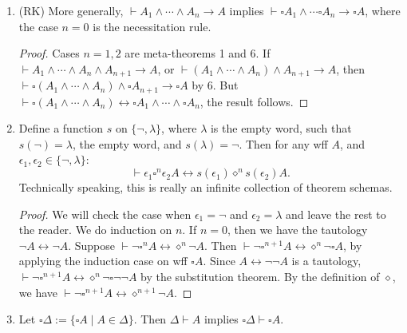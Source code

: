 \documentclass[12pt]{article}
\begin{document}
\begin{enumerate}
\begin{proof}
By assumption and 1, $\vdash \square (A\land B) \to \square C$.  Since $\square A \land \square B \to \square (A\land B)$ is a theorem (see ), we get $\vdash \square A \land \square B \to \square C$ by the law of syllogism.
\end{proof}
\item (RK) More generally, $\vdash A_1\land \cdots \land A_n \to A$ implies $\vdash \square A_1 \land \cdots \square A_n \to \square A$, where the case $n=0$ is the necessitation rule.
\begin{proof}
Cases $n=1,2$ are meta-theorems 1 and 6.  If $\vdash A_1 \land \cdots \land A_n \land A_{n+1} \to A$, or $\vdash (A_1\land \cdots \land A_n) \land A_{n+1} \to A$, then $\vdash \square (A_1\land \cdots \land A_n) \land \square A_{n+1} \to \square A$ by 6.  But $\vdash \square (A_1 \land \cdots \land A_n) \leftrightarrow \square A_1 \land \cdots \land \square A_n$, the result follows.
\end{proof}
\item Define a function $s$ on $\lbrace \neg, \lambda \rbrace$, where  $\lambda$ is the empty word, such that $s(\neg)=\lambda$, the empty word, and $s(\lambda)=\neg$.  Then for any wff $A$, and $\epsilon_1,\epsilon_2\in \lbrace \neg, \lambda \rbrace$: $$\vdash \epsilon_1 \square^n \epsilon_2 A \leftrightarrow s(\epsilon_1) \diamond^n s(\epsilon_2) A.$$
Technically speaking, this is really an infinite collection of theorem schemas.
\begin{proof}  We will check the case when $\epsilon_1 =\neg$ and $\epsilon_2=\lambda$ and leave the rest to the reader.  We do induction on $n$.  If $n=0$, then we have the tautology $\neg A \leftrightarrow \neg A$.  Suppose $\vdash \neg \square^n A \leftrightarrow \diamond^n \neg A$.  Then $\vdash \neg \square^{n+1} A \leftrightarrow \diamond^n \neg \square A$, by applying the induction case on wff $\square A$.  Since $A\leftrightarrow \neg\neg A$ is a tautology, $\vdash \neg \square^{n+1} A \leftrightarrow \diamond^n \neg \square \neg \neg A$ by the substitution theorem.  By the definition of $\diamond$, we have $\vdash \neg \square^{n+1} A \leftrightarrow \diamond^{n+1} \neg A$.
\end{proof}
\item Let $\square \Delta:=\lbrace \square A \mid A\in \Delta\rbrace$.  Then $\Delta \vdash A$ implies $\square \Delta \vdash \square A$.

\end{enumerate}
\end{document}
